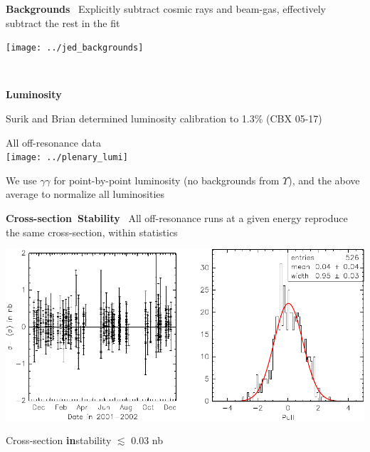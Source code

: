 \documentclass[landscape]{article}
\newenvironment{slide}[1][ ]{\mbox{\bf #1 } \vfill}{\vfill \mbox{ } \pagebreak}
\begin{document}
\begin{slide}[Backgrounds]
  Explicitly subtract cosmic rays and beam-gas, effectively subtract the rest in the fit

  \vspace{0.6 cm}
  \begin{center}
    \texttt{[image: ../jed\_backgrounds]}
  \end{center}

  \vspace{-1 cm}
\end{slide}

\begin{slide}[Luminosity]

  \vfill
  Surik and Brian determined luminosity calibration to 1.3\% (CBX 05-17)

  \vfill
  \begin{center}
    \Huge All off-resonance data \\
    \texttt{[image: ../plenary\_lumi]}
  \end{center}

  \vfill
  We use $\gamma\gamma$ for point-by-point luminosity (no backgrounds
  from $\Upsilon$), and the above average to normalize all luminosities
\end{slide}

\begin{slide}[Cross-section Stability]
  \Huge
  All off-resonance runs at a given energy reproduce the same cross-section, within statistics

  \vfill
  \begin{center}
    \includegraphics[width=\linewidth]{stability}
  \end{center}

  \vfill
  Cross-section {\bf in}stability $\lesssim$ 0.03 nb
\end{slide}
\end{document}
